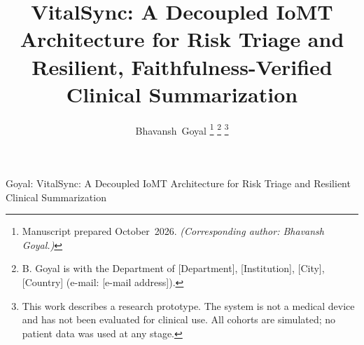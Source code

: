 \documentclass[lettersize,journal]{IEEEtran}
\begin{document}
\title{VitalSync: A Decoupled IoMT Architecture for Risk Triage and
Resilient, Faithfulness-Verified Clinical Summarization}

\author{Bhavansh~Goyal%
\thanks{Manuscript prepared October~2026. \emph{(Corresponding author:
Bhavansh Goyal.)}}%
\thanks{B. Goyal is with the Department of [Department], [Institution],
[City], [Country] (e-mail: [e-mail address]).}%
\thanks{This work describes a research prototype. The system is not a medical
device and has not been evaluated for clinical use. All cohorts are simulated;
no patient data was used at any stage.}}

%
{Goyal: VitalSync: A Decoupled IoMT Architecture for Risk Triage and Resilient Clinical Summarization}

\maketitle
\end{document}
